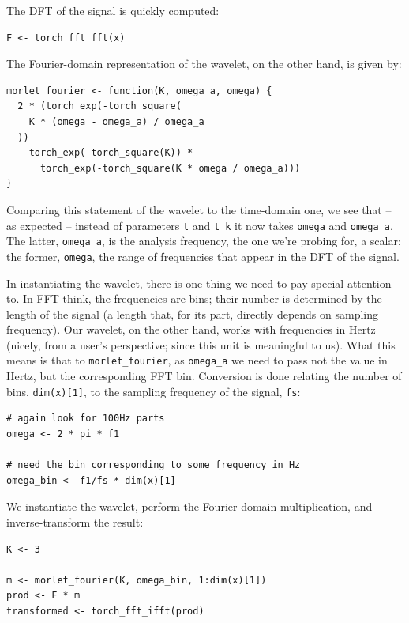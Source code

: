 \documentclass[
  letterpaper,
]{krantz}
\begin{document}
The DFT of the signal is quickly computed:

\begin{verbatim}
F <- torch_fft_fft(x)
\end{verbatim}

The Fourier-domain representation of the wavelet, on the other hand, is
given by:

\begin{verbatim}
morlet_fourier <- function(K, omega_a, omega) {
  2 * (torch_exp(-torch_square(
    K * (omega - omega_a) / omega_a
  )) -
    torch_exp(-torch_square(K)) *
      torch_exp(-torch_square(K * omega / omega_a)))
}
\end{verbatim}

Comparing this statement of the wavelet to the time-domain one, we see
that -- as expected -- instead of parameters \texttt{t} and
\texttt{t\_k} it now takes \texttt{omega} and \texttt{omega\_a}. The
latter, \texttt{omega\_a}, is the analysis frequency, the one we're
probing for, a scalar; the former, \texttt{omega}, the range of
frequencies that appear in the DFT of the signal.

In instantiating the wavelet, there is one thing we need to pay special
attention to. In FFT-think, the frequencies are bins; their number is
determined by the length of the signal (a length that, for its part,
directly depends on sampling frequency). Our wavelet, on the other hand,
works with frequencies in Hertz (nicely, from a user's perspective;
since this unit is meaningful to us). What this means is that to
\texttt{morlet\_fourier}, as \texttt{omega\_a} we need to pass not the
value in Hertz, but the corresponding FFT bin. Conversion is done
relating the number of bins, \texttt{dim(x){[}1{]}}, to the sampling
frequency of the signal, \texttt{fs}:

\begin{verbatim}
# again look for 100Hz parts
omega <- 2 * pi * f1

# need the bin corresponding to some frequency in Hz
omega_bin <- f1/fs * dim(x)[1]
\end{verbatim}

We instantiate the wavelet, perform the Fourier-domain multiplication,
and inverse-transform the result:

\begin{verbatim}
K <- 3

m <- morlet_fourier(K, omega_bin, 1:dim(x)[1])
prod <- F * m
transformed <- torch_fft_ifft(prod)
\end{verbatim}
\end{document}
